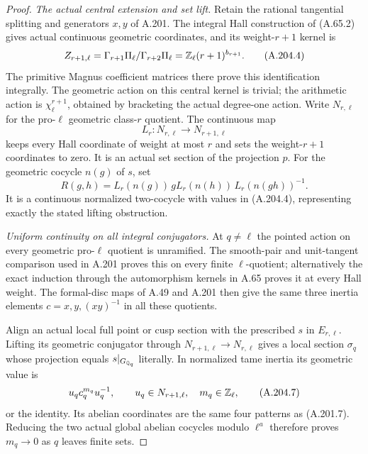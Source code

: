 \begin{proof}
\emph{The actual central extension and set lift.}
Retain the rational tangential splitting and generators
\(x,y\) of A.201.  The integral Hall construction of
(A.65.2) gives actual continuous geometric coordinates,
and its weight-\(r+1\) kernel is
\[
 Z_{r+1,\ell}=\Gamma_{r+1}\Pi_\ell/\Gamma_{r+2}\Pi_\ell
       =\mathbb Z_\ell(r+1)^{b_{r+1}}.
\tag{A.204.4}
\]
The primitive Magnus coefficient matrices there prove this
identification integrally.  The geometric action on this
central kernel is trivial; the arithmetic action is
\(\chi_\ell^{r+1}\), obtained by bracketing the actual
degree-one action.  Write \(N_{r,\ell}\) for the pro-\(\ell\)
geometric class-\(r\) quotient.  The continuous map
\[
 L_r:N_{r,\ell}\longrightarrow N_{r+1,\ell}
\tag{A.204.5}
\]
keeps every Hall coordinate of weight at most \(r\) and
sets the weight-\(r+1\) coordinates to zero.  It is an
actual set section of the projection \(p\).
For the geometric cocycle \(n(g)\) of \(s\), set
\[
 R(g,h)=L_r(n(g))\,gL_r(n(h))\,L_r(n(gh))^{-1}.
\tag{A.204.6}
\]
It is a continuous normalized two-cocycle with values in
(A.204.4), representing exactly the stated lifting obstruction.

\emph{Uniform continuity on all integral conjugators.}
At \(q\ne\ell\) the pointed action on every geometric
pro-\(\ell\) quotient is unramified.  The smooth-pair and
unit-tangent comparison used in A.201 proves this on every
finite \(\ell\)-quotient; alternatively the exact induction
through the automorphism kernels in A.65 proves it at every
Hall weight.  The formal-disc maps of A.49 and A.201 then
give the same three inertia elements
\(c=x,y,(xy)^{-1}\) in all these quotients.

Align an actual local full point or cusp section with the
prescribed \(s\) in \(E_{r,\ell}\).  Lifting its geometric
conjugator through \(N_{r+1,\ell}\to N_{r,\ell}\) gives a
local section \(\sigma_q\) whose projection equals
\(s|_{G_{\mathbb Q_q}}\) literally.  In normalized tame inertia
its geometric value is
\[
          u_qc_q^{m_q}u_q^{-1},\qquad
 u_q\in N_{r+1,\ell},\quad m_q\in\mathbb Z_\ell,
\tag{A.204.7}
\]
or the identity.  Its abelian coordinates are the same
four patterns as (A.201.7).  Reducing the two actual
global abelian cocycles modulo \(\ell^a\) therefore
proves \(m_q\to0\) as \(q\) leaves finite sets.


\end{proof}
